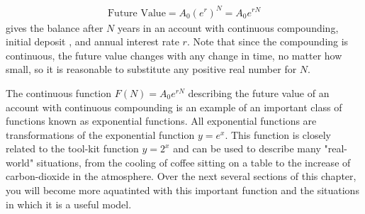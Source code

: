 \documentclass[10pt,]{book}
\theoremstyle{plain}
\theoremstyle{definition}
\theoremstyle{definition}
\theoremstyle{definition}
\numberwithin{equation}{section}
\begin{document}
%
\begin{gather*}
\text{Future Value} = A_0 (e^r)^N = A_0 e^{rN}
\end{gather*}
\hypertarget{p-220}{}%
gives the balance after \(N\) years in an account with continuous compounding, initial deposit , and annual interest rate \(r\).  Note that since the compounding is continuous, the future value changes with any change in time, no matter how small, so it is reasonable to substitute any positive real number for \(N\).%
\par
\hypertarget{p-221}{}%
The continuous function \(F(N)=A_0 e^{rN}\) describing the future value of an account with continuous compounding is an example of an important class of functions known as exponential functions.  All exponential functions are transformations of the exponential function \(y=e^x\).  This function is closely related to the tool-kit function \(y=2^x\) and can be used to describe many "real-world" situations, from the cooling of coffee sitting on a table to the increase of carbon-dioxide in the atmosphere.  Over the next several sections of this chapter, you will become more aquatinted with this important function and the situations in which it is a useful model.%
\typeout{************************************************}
\typeout{************************************************}
\end{document}
